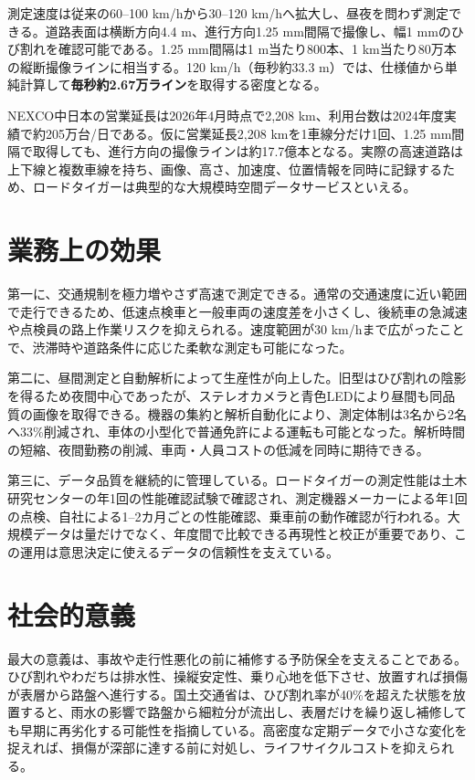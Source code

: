 \documentclass[8pt,a4paper,twocolumn]{ltjsarticle}
\begin{document}
測定速度は従来の60--100 km/hから30--120 km/hへ拡大し、昼夜を問わず測定できる。道路表面は横断方向4.4 m、進行方向1.25 mm間隔で撮像し、幅1 mmのひび割れを確認可能である\cite{nexco2023,catalog2025}。1.25 mm間隔は1 m当たり800本、1 km当たり80万本の縦断撮像ラインに相当する。120 km/h（毎秒約33.3 m）では、仕様値から単純計算して\textbf{毎秒約2.67万ライン}を取得する密度となる。

NEXCO中日本の営業延長は2026年4月時点で2,208 km、利用台数は2024年度実績で約205万台/日である\cite{nexcoarea}。仮に営業延長2,208 kmを1車線分だけ1回、1.25 mm間隔で取得しても、進行方向の撮像ラインは約17.7億本となる。実際の高速道路は上下線と複数車線を持ち、画像、高さ、加速度、位置情報を同時に記録するため、ロードタイガーは典型的な大規模時空間データサービスといえる。

\section{業務上の効果}

第一に、交通規制を極力増やさず高速で測定できる。通常の交通速度に近い範囲で走行できるため、低速点検車と一般車両の速度差を小さくし、後続車の急減速や点検員の路上作業リスクを抑えられる。速度範囲が30 km/hまで広がったことで、渋滞時や道路条件に応じた柔軟な測定も可能になった\cite{nexco2023}。

第二に、昼間測定と自動解析によって生産性が向上した。旧型はひび割れの陰影を得るため夜間中心であったが、ステレオカメラと青色LEDにより昼間も同品質の画像を取得できる。機器の集約と解析自動化により、測定体制は3名から2名へ33\%削減され、車体の小型化で普通免許による運転も可能となった。解析時間の短縮、夜間勤務の削減、車両・人員コストの低減を同時に期待できる\cite{nexco2023}。

第三に、データ品質を継続的に管理している。ロードタイガーの測定性能は土木研究センターの年1回の性能確認試験で確認され、測定機器メーカーによる年1回の点検、自社による1--2カ月ごとの性能確認、乗車前の動作確認が行われる\cite{nexcosafety}。大規模データは量だけでなく、年度間で比較できる再現性と校正が重要であり、この運用は意思決定に使えるデータの信頼性を支えている。

\section{社会的意義}

最大の意義は、事故や走行性悪化の前に補修する予防保全を支えることである。ひび割れやわだちは排水性、操縦安定性、乗り心地を低下させ、放置すれば損傷が表層から路盤へ進行する。国土交通省は、ひび割れ率が40\%を超えた状態を放置すると、雨水の影響で路盤から細粒分が流出し、表層だけを繰り返し補修しても早期に再劣化する可能性を指摘している\cite{xroad2022}。高密度な定期データで小さな変化を捉えれば、損傷が深部に達する前に対処し、ライフサイクルコストを抑えられる。
\end{document}
